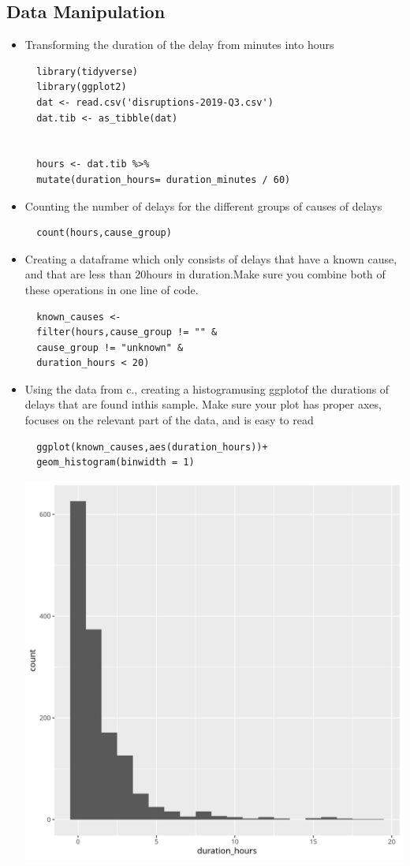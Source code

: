 \documentclass[11pt]{article}
\begin{document}
\subsection{Data Manipulation}
\label{sec:org4a69a2b}
\begin{itemize}
\item Transforming the duration of the delay from minutes into hours
\begin{verbatim}
  library(tidyverse)
  library(ggplot2)
  dat <- read.csv('disruptions-2019-Q3.csv')
  dat.tib <- as_tibble(dat)


  hours <- dat.tib %>%
  mutate(duration_hours= duration_minutes / 60)
\end{verbatim}
\item Counting the number of delays for the different groups of causes of delays
\begin{verbatim}
  count(hours,cause_group)
\end{verbatim}
\item Creating a dataframe which only consists of delays that have a known cause, and that are less than 20hours in duration.Make sure you combine both of these operations in one line of code.

\begin{verbatim}
  known_causes <-
  filter(hours,cause_group != "" &
  cause_group != "unknown" &
  duration_hours < 20)
\end{verbatim}
\item Using the data from c., creating a histogramusing ggplotof the durations of delays that are found inthis sample. Make sure your plot has proper axes, focuses on the relevant part of the data, and is easy to read
\begin{verbatim}
  ggplot(known_causes,aes(duration_hours))+
  geom_histogram(binwidth = 1)
\end{verbatim}
\begin{center}
  \includegraphics[width=.9\linewidth]{known_causes.jpg}
\end{center}
\end{itemize}
\end{document}
